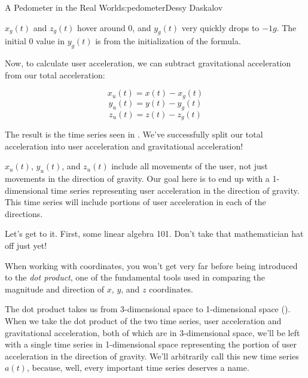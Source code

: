 \begin{aosachapter}{A Pedometer in the Real World}{s:pedometer}{Dessy Daskalov}

$x_{g}(t)$ and $z_{g}(t)$ hover around 0, and $y_{g}(t)$ very quickly
drops to $-1g$. The initial 0 value in $y_{g}(t)$ is from the
initialization of the formula.

Now, to calculate user acceleration, we can subtract gravitational
acceleration from our total acceleration:

\[
x_{u}(t) = x(t) - x_{g}(t)
\] \[
y_{u}(t) = y(t) - y_{g}(t)
\] \[
z_{u}(t) = z(t) - z_{g}(t)
\]

The result is the time series seen in
. We've successfully split
our total acceleration into user acceleration and gravitational
acceleration!


\label{isolating-user-acceleration-in-the-direction-of-gravity}

$x_{u}(t)$, $y_{u}(t)$, and $z_{u}(t)$ include all movements of the
user, not just movements in the direction of gravity. Our goal here is
to end up with a 1-dimensional time series representing user
acceleration in the direction of gravity. This time series will include
portions of user acceleration in each of the directions.

Let's get to it. First, some linear algebra 101. Don't take that
mathematician hat off just yet!

\label{the-dot-product}

When working with coordinates, you won't get very far before being
introduced to the \emph{dot product}, one of the fundamental tools used
in comparing the magnitude and direction of $x$, $y$, and $z$
coordinates.

The dot product takes us from 3-dimensional space to 1-dimensional space
(). When we take the dot product
of the two time series, user acceleration and gravitational
acceleration, both of which are in 3-dimensional space, we'll be left
with a single time series in 1-dimensional space representing the
portion of user acceleration in the direction of gravity. We'll
arbitrarily call this new time series $a(t)$, because, well, every
important time series deserves a name.


\end{aosachapter}
